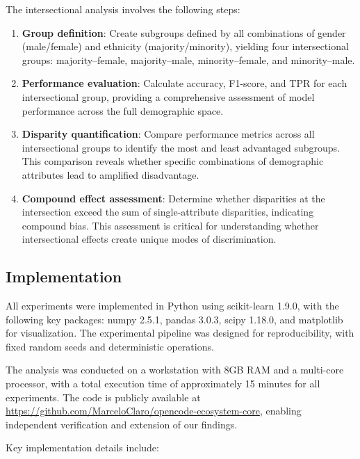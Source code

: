 The intersectional analysis involves the following steps:

\begin{enumerate}[leftmargin=*]
    \item \textbf{Group definition}: Create subgroups defined by all 
          combinations of gender (male/female) and ethnicity (majority/minority), 
          yielding four intersectional groups: majority--female, majority--male, 
          minority--female, and minority--male.
    \item \textbf{Performance evaluation}: Calculate accuracy, F1-score, and 
          TPR for each intersectional group, providing a comprehensive 
          assessment of model performance across the full demographic space.
    \item \textbf{Disparity quantification}: Compare performance metrics 
          across all intersectional groups to identify the most and least 
          advantaged subgroups. This comparison reveals whether specific 
          combinations of demographic attributes lead to amplified disadvantage.
    \item \textbf{Compound effect assessment}: Determine whether disparities 
          at the intersection exceed the sum of single-attribute disparities, 
          indicating compound bias. This assessment is critical for understanding 
          whether intersectional effects create unique modes of discrimination.
\end{enumerate}

\subsection{Implementation}

All experiments were implemented in Python using scikit-learn 1.9.0, 
with the following key packages: numpy 2.5.1, pandas 3.0.3, scipy 1.18.0, 
and matplotlib for visualization. The experimental pipeline was designed 
for reproducibility, with fixed random seeds and deterministic operations.

The analysis was conducted on a workstation with 8GB RAM and a multi-core 
processor, with a total execution time of approximately 15 minutes for all 
experiments. The code is publicly available at 
\url{https://github.com/MarceloClaro/opencode-ecosystem-core}, enabling 
independent verification and extension of our findings.

Key implementation details include:

